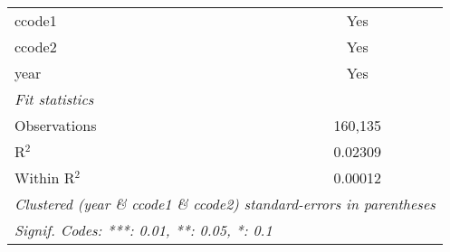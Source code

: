 \begin{tabular}{lc}
   ccode1              & Yes\\  
   ccode2              & Yes\\  
   year                & Yes\\  
   \midrule
   \emph{Fit statistics}\\
   Observations        & 160,135\\  
   R$^2$               & 0.02309\\  
   Within R$^2$        & 0.00012\\  
   \midrule \midrule
   \multicolumn{2}{l}{\emph{Clustered (year \& ccode1 \& ccode2) standard-errors in parentheses}}\\
   \multicolumn{2}{l}{\emph{Signif. Codes: ***: 0.01, **: 0.05, *: 0.1}}\\
\end{tabular}
\par\endgroup



